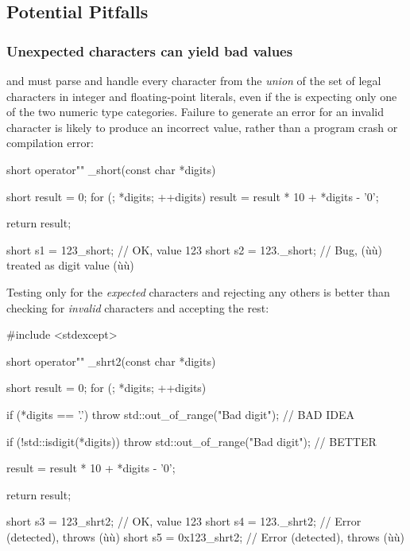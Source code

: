 \subsection[Potential Pitfalls]{Potential Pitfalls}\label{potential-pitfalls-defmemberinit}

\subsubsection[Unexpected characters can yield bad values]{Unexpected characters can yield bad values}\label{unexpected-characters-can-yield-bad-values}

 and  must
parse and handle every character from the \emph{union} of the set of
legal characters in integer and floating-point literals, even if the
 is expecting only one of the two numeric type
categories. Failure to generate an error for an invalid character is
likely to produce an incorrect value, rather than a program crash or
compilation error:

\begin{emcppslisting}
short operator"" _short(const char *digits)
{
    short result = 0;
    for (; *digits; ++digits)
    {
        result = result * 10 + *digits - '0';
    }

    return result;
}

short s1 = 123_short;   // OK, value 123
short s2 = 123._short;  // Bug, (ù{}ù) treated as digit value (ù{}ù)
\end{emcppslisting}
    
\noindent Testing only for the \emph{expected} characters and rejecting any others
is better than checking for \emph{invalid} characters and accepting the
rest:

\begin{emcppslisting}
#include <stdexcept>

short operator"" _shrt2(const char *digits)
{
    short result = 0;
    for (; *digits; ++digits)
    {
        if (*digits == '.')
        {
            throw std::out_of_range("Bad digit");  // BAD IDEA
        }

        if (!std::isdigit(*digits))
        {
            throw std::out_of_range("Bad digit");  // BETTER
        }

        result = result * 10 + *digits - '0';
    }

    return result;
}

short s3 = 123_shrt2;    // OK, value 123
short s4 = 123._shrt2;   // Error (detected), throws (ù{}ù)
short s5 = 0x123_shrt2;  // Error (detected), throws (ù{}ù)
\end{emcppslisting}
    
